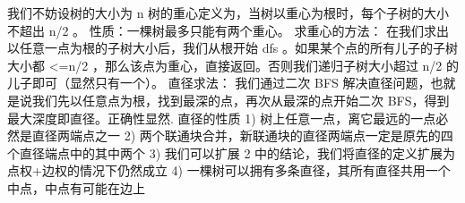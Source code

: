 {}
\markdownRendererSectionEnd \markdownRendererSectionBegin
{}\markdownRendererInterblockSeparator
{}\markdownRendererSectionBegin
{}\markdownRendererInterblockSeparator
{}我们不妨设树的大小为\markdownRendererDollarSign{} n \markdownRendererDollarSign{}\markdownRendererParagraphSeparator
{}树的重心定义为，当树以重心为根时，每个子树的大小不超出\markdownRendererDollarSign{} n/2 \markdownRendererDollarSign{}。\markdownRendererParagraphSeparator
{}性质：一棵树最多只能有两个重心。\markdownRendererParagraphSeparator
{}求重心的方法：\markdownRendererParagraphSeparator
{}在我们求出以任意一点为根的子树大小后，我们从根开始\markdownRendererDollarSign{} dfs \markdownRendererDollarSign{}。如果某个点的所有儿子的子树大小都\markdownRendererDollarSign{} <=n/2 \markdownRendererDollarSign{}，那么该点为重心，直接返回。否则我们递归子树大小超过\markdownRendererDollarSign{} n/2 \markdownRendererDollarSign{}的儿子即可（显然只有一个）。\markdownRendererInterblockSeparator
{}\markdownRendererInterblockSeparator
{}
\markdownRendererSectionEnd \markdownRendererSectionBegin
{}\markdownRendererInterblockSeparator
{}直径求法：\markdownRendererParagraphSeparator
{}我们通过二次 \markdownRendererDollarSign{}BFS\markdownRendererDollarSign{} 解决直径问题，也就是说我们先以任意点为根，找到最深的点，再次从最深的点开始二次 \markdownRendererDollarSign{}BFS\markdownRendererDollarSign{}，得到最大深度即直径。正确性显然.\markdownRendererInterblockSeparator
{}\markdownRendererInterblockSeparator
{}直径的性质\markdownRendererParagraphSeparator
{}\markdownRendererDollarSign{} 1) \markdownRendererDollarSign{}树上任意一点，离它最远的一点必然是直径两端点之一\markdownRendererParagraphSeparator
{}\markdownRendererDollarSign{} 2) \markdownRendererDollarSign{}两个联通块合并，新联通块的直径两端点一定是原先的四个直径端点中的其中两个\markdownRendererParagraphSeparator
{}\markdownRendererDollarSign{} 3) \markdownRendererDollarSign{}我们可以扩展\markdownRendererDollarSign{} 2 \markdownRendererDollarSign{}中的结论，我们将直径的定义扩展为点权+边权的情况下仍然成立\markdownRendererParagraphSeparator
{}\markdownRendererDollarSign{} 4) \markdownRendererDollarSign{}一棵树可以拥有多条直径，其所有直径共用一个中点，中点有可能在边上\markdownRendererInterblockSeparator
{}
\markdownRendererSectionEnd \markdownRendererSectionBegin
